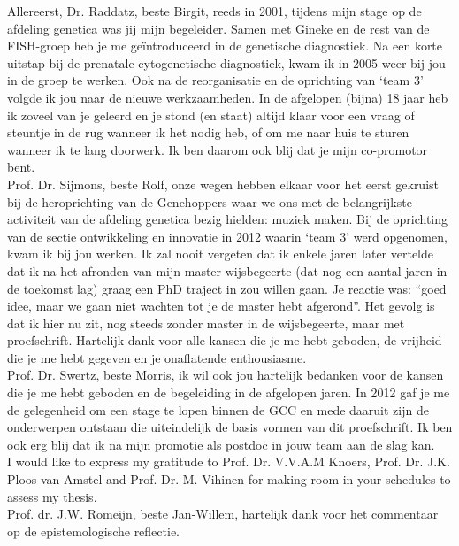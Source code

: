 \begin{appendices}
	\noindent Allereerst, Dr. Raddatz, beste Birgit, reeds in 2001, tijdens mijn stage op de afdeling genetica was jij mijn begeleider. Samen met Gineke en de rest van de FISH-groep heb je me geïntroduceerd in de genetische diagnostiek. Na een korte uitstap bij de prenatale cytogenetische diagnostiek, kwam ik in 2005 weer bij jou in de groep te werken. Ook na de reorganisatie en de oprichting van ‘team 3’ volgde ik jou naar de nieuwe werkzaamheden. In de afgelopen (bijna) 18 jaar heb ik zoveel van je geleerd en je stond (en staat) altijd klaar voor een vraag of steuntje in de rug wanneer ik het nodig heb, of om me naar huis te sturen wanneer ik te lang doorwerk. Ik ben daarom ook blij dat je mijn co-promotor bent.\\ 
	
	\noindent Prof. Dr. Sijmons, beste Rolf, onze wegen hebben elkaar voor het eerst gekruist bij de heroprichting van de Genehoppers waar we ons met de belangrijkste activiteit van de afdeling genetica bezig hielden: muziek maken. Bij de oprichting van de sectie ontwikkeling en innovatie in 2012 waarin ‘team 3’ werd opgenomen, kwam ik bij jou werken. Ik zal nooit vergeten dat ik enkele jaren later vertelde dat ik na het afronden van mijn master wijsbegeerte (dat nog een aantal jaren in de toekomst lag) graag een PhD traject in zou willen gaan. Je reactie was: “goed idee, maar we gaan niet wachten tot je de master hebt afgerond”. Het gevolg is dat ik hier nu zit, nog steeds zonder master in de wijsbegeerte, maar met proefschrift. Hartelijk dank voor alle kansen die je me hebt geboden, de vrijheid die je me hebt gegeven en je onaflatende enthousiasme.\\ 
	
	\noindent Prof. Dr. Swertz, beste Morris, ik wil ook jou hartelijk bedanken voor de kansen die je me hebt geboden en de begeleiding in de afgelopen jaren. In 2012 gaf je me de gelegenheid om een stage te lopen binnen de GCC en mede daaruit zijn de onderwerpen ontstaan die uiteindelijk de basis vormen van dit proefschrift. Ik ben ook erg blij dat ik na mijn promotie als postdoc in jouw team aan de slag kan.\\ 
	
	\noindent I would like to express my gratitude to Prof. Dr. V.V.A.M Knoers, Prof. Dr. J.K. Ploos van Amstel and Prof. Dr. M. Vihinen for making room in your schedules to assess my thesis.\\ 
	
	\noindent Prof. dr. J.W. Romeijn, beste Jan-Willem, hartelijk dank voor het commentaar op de epistemologische reflectie.\\
	

\end{appendices}
